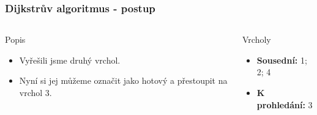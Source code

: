 \documentclass{beamer}
\begin{document}
\begin{frame}
    \frametitle{Dijkstrův algoritmus - postup}
    \begin{columns}
        \begin{block}{Popis}
            \begin{itemize}
                \item Vyřešili jsme druhý vrchol.
                \item Nyní si jej můžeme označit jako hotový a přestoupit na vrchol 3.
            \end{itemize}
        \end{block}
        \begin{block}{Vrcholy}
            \begin{itemize}
                \item \textbf{Sousední:} 1; 2; 4 
                \item \textbf{K prohledání:} 3
            \end{itemize}
        \end{block}
    \end{columns}
\end{frame}
\end{document}
